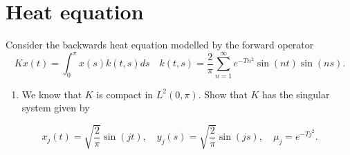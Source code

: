 \section{Heat equation}%
\label{sec:heat-equation}

Consider the backwards heat equation modelled by the forward operator
\[
	Kx(t) = \int_0^\pi x(s)k(t, s)ds \quad k(t, s) = \frac{2}{\pi} \sum_{n=1}^{\infty} e^{-T n^2} \sin(nt) \sin(ns).
\] 

\begin{enumerate}[label = (\alph*)]
  \item We know that $K$ is compact in $L^2(0, \pi)$. Show that $K$ has the singular system given by
\end{enumerate}
\[
	x_j(t) = \sqrt{\frac{2}{\pi}} \sin(jt), \quad y_j(s) = \sqrt{\frac{2}{\pi}} \sin(js), \quad \mu_j = e^{-T j^2}.
\] 
\hrulefill

